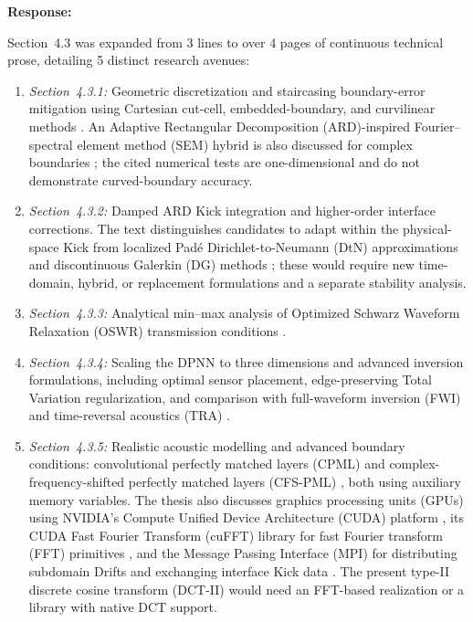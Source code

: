 \documentclass[11pt,a4paper]{article}
\newenvironment{response}{
    \par\vspace{1mm}\noindent\textbf{\textcolor{responseframe}{Response:}}\par\vspace{1mm}
}{
    \par\vspace{3mm}
}
\begin{document}
\begin{response}
Section~4.3 was expanded from 3 lines to over 4 pages of continuous technical prose, detailing 5 distinct research avenues:
\begin{enumerate}
    \item \emph{Section~4.3.1:} Geometric discretization and staircasing boundary-error mitigation using Cartesian cut-cell, embedded-boundary, and curvilinear methods \citep{popescu_finite_2008,alsalem_embedded_2018,appelo_fourth_2012,cerimele_numerical_2008,yuan_perfectly_2014}. An Adaptive Rectangular Decomposition (ARD)-inspired Fourier--spectral element method (SEM) hybrid is also discussed for complex boundaries \citep{borrel_jensen_fourier_sem_2022}; the cited numerical tests are one-dimensional and do not demonstrate curved-boundary accuracy.
    \item \emph{Section~4.3.2:} Damped ARD Kick integration and higher-order interface corrections. The text distinguishes candidates to adapt within the physical-space Kick from localized Pad\'e Dirichlet-to-Neumann (DtN) approximations \citep{caudron_optimized_2020} and discontinuous Galerkin (DG) methods \citep{heinz_nonconforming_dg_2023}; these would require new time-domain, hybrid, or replacement formulations and a separate stability analysis.
    \item \emph{Section~4.3.3:} Analytical min--max analysis of Optimized Schwarz Waveform Relaxation (OSWR) transmission conditions \citep{gander_optimal_2003}.
    \item \emph{Section~4.3.4:} Scaling the DPNN to three dimensions and advanced inversion formulations, including optimal sensor placement, edge-preserving Total Variation regularization, and comparison with full-waveform inversion (FWI) \citep{plessix_adjoint_2006,pratt_gauss_newton_1998} and time-reversal acoustics (TRA) \citep{fink_time_1992,kahana_time_2022}.
    \item \emph{Section~4.3.5:} Realistic acoustic modelling and advanced boundary conditions: convolutional perfectly matched layers (CPML) \citep{li_bou_matar_cpml_2010,martin_komatitsch_cpml_2009} and complex-frequency-shifted perfectly matched layers (CFS-PML) \citep{gao_cfs_pml_2015}, both using auxiliary memory variables. The thesis also discusses graphics processing units (GPUs) using NVIDIA's Compute Unified Device Architecture (CUDA) platform \citep{nvidia_cuda_programming_guide}, its CUDA Fast Fourier Transform (cuFFT) library for fast Fourier transform (FFT) primitives \citep{nvidia_cufft_library}, and the Message Passing Interface (MPI) for distributing subdomain Drifts and exchanging interface Kick data \citep{mpi_forum_standard_50}. The present type-II discrete cosine transform (DCT-II) would need an FFT-based realization or a library with native DCT support.
\end{enumerate}
\end{response}
\end{document}
